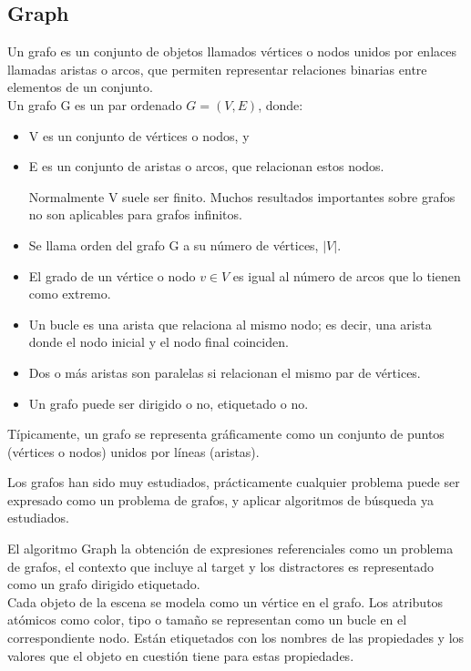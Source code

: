 \subsection{Graph}
\label{graph}
Un grafo es un conjunto de objetos llamados v\'ertices o nodos unidos por enlaces llamadas aristas o arcos, que permiten representar relaciones binarias entre elementos de un conjunto. \\


Un grafo G es un par ordenado $G=(V,E)$, donde:\\
\begin{itemize}
   \item V es un conjunto de v\'ertices o nodos, y
    \item E es un conjunto de aristas o arcos, que relacionan estos nodos.

Normalmente V suele ser finito. Muchos resultados importantes sobre grafos no son aplicables para grafos infinitos.

\item Se llama orden del grafo G a su n\'umero de v\'ertices, $|V|$.

\item El grado de un v\'ertice o nodo $v \in V$ es igual al n\'umero de arcos que lo tienen como extremo.

\item Un bucle es una arista que relaciona al mismo nodo; es decir, una arista donde el nodo inicial y el nodo final coinciden.

\item Dos o m\'as aristas son paralelas si relacionan el mismo par de v\'ertices.

\item Un grafo puede ser dirigido o no, etiquetado o no.
\end{itemize}
T\'{i}picamente, un grafo se representa gr\'aficamente como un conjunto de puntos (v\'ertices o nodos) unidos por l\'{i}neas (aristas).

Los grafos han sido muy estudiados, pr\'acticamente cualquier problema puede ser expresado como un problema de grafos, y aplicar algoritmos de b\'usqueda ya estudiados.

El algoritmo Graph la obtenci\'on de expresiones referenciales como un problema de grafos, el contexto que incluye al target y los distractores es representado como un grafo dirigido etiquetado. \\

Cada objeto de la escena se modela como un v\'ertice en el grafo. Los atributos at\'omicos como color, tipo o tama\~no se representan como un bucle en el correspondiente nodo. Est\'an etiquetados con los nombres de las propiedades y los valores que el objeto en cuesti\'on tiene para estas propiedades. \\

